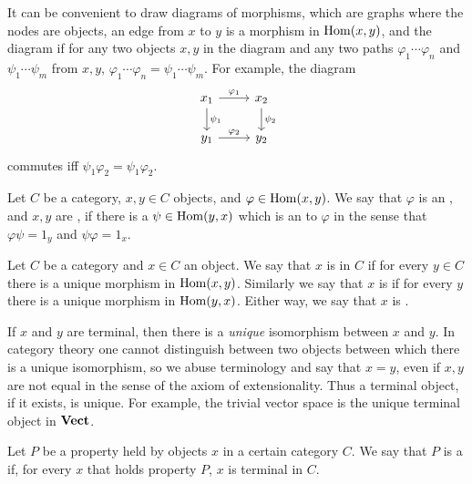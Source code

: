\begin{subsec}
It can be convenient to draw diagrams of morphisms, which are graphs where the nodes are objects, an edge from $x$ to $y$ is a morphism in $\operatorname{Hom}(x, y)$, and the diagram  if for any two objects $x, y$ in the diagram and any two paths $\varphi_1\cdots\varphi_n$ and $\psi_1\cdots\psi_m$ from $x, y$, $\varphi_1\cdots\varphi_n = \psi_1\cdots\psi_m$.
For example, the diagram
$$\begin{tikzcd}
x_1 \arrow[r,"\varphi_1"] \arrow[d,"\psi_1"] & x_2 \arrow[d,"\psi_2"]\\
y_1 \arrow[r,"\varphi_2"] & y_2
\end{tikzcd}$$
commutes iff $\psi_1\varphi_2 = \psi_1\varphi_2$.
\end{subsec}

\begin{definition}
Let $C$ be a category, $x,y \in C$ objects, and $\varphi \in \operatorname{Hom}(x, y)$.
We say that $\varphi$ is an , and $x,y$ are , if there is a $\psi \in \operatorname{Hom}(y, x)$ which is an  to $\varphi$ in the sense that $\varphi\psi = 1_y$ and $\psi\varphi = 1_x$.
\end{definition}

\begin{definition}
Let $C$ be a category and $x \in C$ an object.
We say that $x$ is  in $C$ if for every $y \in C$ there is a unique morphism in $\operatorname{Hom}(x, y)$.
Similarly we say that $x$ is  if for every $y$ there is a unique morphism in $\operatorname{Hom}(y, x)$.
Either way, we say that $x$ is .
\end{definition}

\begin{subsec}
If $x$ and $y$ are terminal, then there is a \emph{unique} isomorphism between $x$ and $y$.
In category theory one cannot distinguish between two objects between which there is a unique isomorphism, so we abuse terminology and say that $x = y$, even if $x,y$ are not equal in the sense of the axiom of extensionality.
Thus a terminal object, if it exists, is unique.
For example, the trivial vector space is the unique terminal object in $\mathbf{Vect}$.
\end{subsec}

\begin{definition}
Let $P$ be a property held by objects $x$ in a certain category $C$.
We say that $P$ is a  if, for every $x$ that holds property $P$, $x$ is terminal in $C$.
\end{definition}

